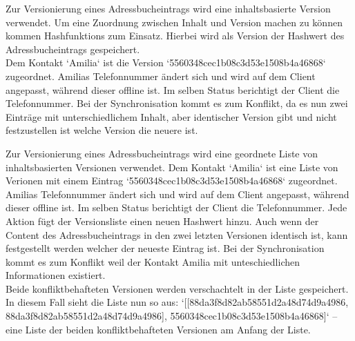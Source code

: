 \begin{description}[leftmargin=0.5cm,style=nextline]
  \item[Szenario V3 -- Inhaltsbasierte Version:]%
    Zur Versionierung eines Adressbucheintrags wird eine inhaltsbasierte Version verwendet. Um eine Zuordnung zwischen Inhalt und Version machen zu können kommen \Glspl{Hashfunktion} zum Einsatz. Hierbei wird als Version der Hashwert des Adressbucheintrags gespeichert.\\
    Dem Kontakt `Amilia` ist die Version `5560348cec1b08c3d53e1508b4a46868` zugeordnet. Amilias Telefonnummer ändert sich und wird auf dem Client angepasst, während dieser offline ist.
    Im selben Status berichtigt der Client die Telefonnummer. Bei der Synchronisation kommt es zum Konflikt, da es nun zwei Einträge mit unterschiedlichem Inhalt, aber identischer Version gibt und nicht festzustellen ist welche Version die neuere ist.\\
  \item[Szenario V4 -- Liste von inhaltsbasierten Versionen:]
    Zur Versionierung eines Adressbucheintrags wird eine geordnete Liste von inhaltsbasierten Versionen verwendet.
    Dem Kontakt `Amilia` ist eine Liste von Verionen mit einem Eintrag `5560348cec1b08c3d53e1508b4a46868` zugeordnet.
    Amilias Telefonnummer ändert sich und wird auf dem Client angepasst, während dieser offline ist. Im selben Status berichtigt der Client die Telefonnummer.
    Jede Aktion fügt der Versionsliste einen neuen Hashwert hinzu.
    Auch wenn der Content des Adressbucheintrags in den zwei letzten Versionen identisch ist, kann festgestellt werden welcher der neueste Eintrag ist.
    Bei der Synchronisation kommt es zum Konflikt weil der Kontakt Amilia mit unteschiedlichen Informationen existiert.\\
    Beide konfliktbehafteten Versionen werden verschachtelt in der Liste gespeichert.
    In diesem Fall sieht die Liste nun so aus: `[[88da3f8d82ab58551d2a48d74d9a4986, 88da3f8d82ab58551d2a48d74d9a4986], 5560348cec1b08c3d53e1508b4a46868]` -- eine Liste der beiden konfliktbehafteten Versionen am Anfang der Liste.
\end{description}
%
%
